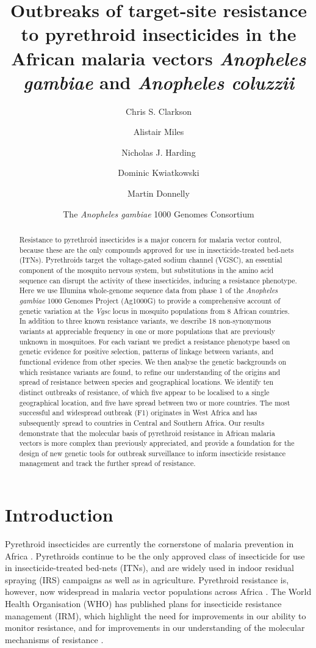 \documentclass[a4paper,11pt,abstracton,hidelinks]{scrartcl}
\title{
Outbreaks of target-site resistance to pyrethroid insecticides in the African malaria vectors \emph{Anopheles gambiae} and \emph{Anopheles coluzzii}
}
\author[1]{Chris S. Clarkson}
\author[2,1]{Alistair Miles}
\author[2]{Nicholas J. Harding}
\author[1,2]{Dominic Kwiatkowski}
\author[3,1]{Martin Donnelly}
\author[4]{The \emph{Anopheles gambiae} 1000 Genomes Consortium}
\affil[1]{Wellcome Trust Sanger Institute, Hinxton, Cambridge CB10 1SA}
\affil[2]{Big Data Institute, Old Road, Oxford OX3 7FZ}
\affil[3]{Liverpool School of Tropical Medicine, Pembroke Place, Liverpool L3 5QA}
\affil[4]{https://www.malariagen.net/projects/ag1000g\#people}
\begin{document}
\maketitle


\begin{abstract}


Resistance to pyrethroid insecticides is a major concern for malaria vector control, because these are the only compounds approved for use in insecticide-treated bed-nets (ITNs). 
Pyrethroids target the voltage-gated sodium channel (VGSC), an essential component of the mosquito nervous system, but substitutions in the amino acid sequence can disrupt the activity of these insecticides, inducing a resistance phenotype. 
%
Here we use Illumina whole-genome sequence data from phase 1 of the \emph{Anopheles gambiae} 1000 Genomes Project (Ag1000G) to provide a comprehensive account of genetic variation at the \emph{Vgsc} locus in mosquito populations from 8 African countries.
%
In addition to three known resistance variants, we describe 18 non-synonymous variants at appreciable frequency in one or more populations that are previously unknown in mosquitoes.
%
For each variant we predict a resistance phenotype based on genetic evidence for positive selection, patterns of linkage between variants, and functional evidence from other species.
%
We then analyse the genetic backgrounds on which resistance variants are found, to refine our understanding of the origins and spread of resistance between species and geographical locations.
%
We identify ten distinct outbreaks of resistance, of which five appear to be localised to a single geographical location, and five have spread between two or more countries.
%
The most successful and widespread outbreak (F1) originates in West Africa and has subsequently spread to countries in Central and Southern Africa.
%
Our results demonstrate that the molecular basis of pyrethroid resistance in African malaria vectors is more complex than previously appreciated, and provide a foundation for the design of new genetic tools for outbreak surveillance to inform insecticide resistance management and track the further spread of resistance.

\end{abstract}


\section*{Introduction}


Pyrethroid insecticides are currently the cornerstone of malaria prevention in Africa \cite{Bhatt2015}. 
%
Pyrethroids continue to be the only approved class of insecticide for use in insecticide-treated bed-nets (ITNs), and are widely used in indoor residual spraying (IRS) campaigns as well as in agriculture.
%
Pyrethroid resistance is, however, now widespread in malaria vector populations across Africa \cite{Hemingway2016}.
%
The World Health Organisation (WHO) has published plans for insecticide resistance management (IRM), which highlight the need for improvements in our ability to monitor resistance, and for improvements in our understanding of the molecular mechanisms of resistance \cite{WorldHealthOrganization2012}.
\end{document}
